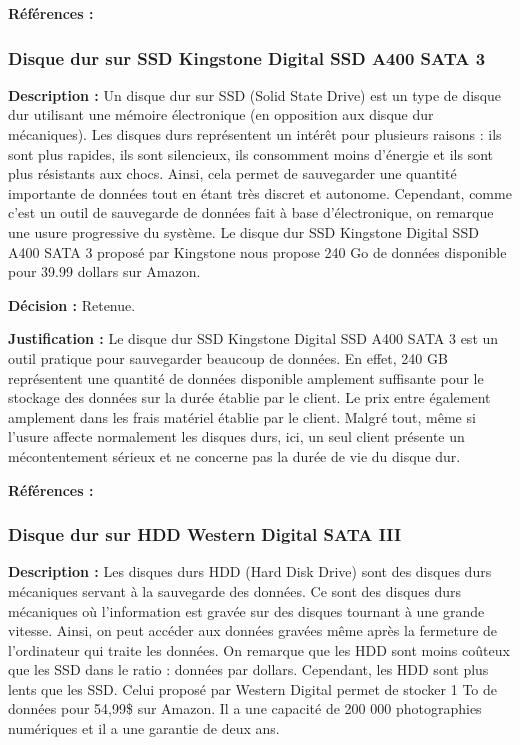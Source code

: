 \textbf{Références :} \cite{hubic} \cite{clgo} \cite{incl}

\subsubsection{Disque dur sur SSD Kingstone Digital SSD A400 SATA 3 }
\textbf{Description :} Un disque dur sur SSD (Solid State Drive) est un type de disque dur utilisant une mémoire électronique (en opposition aux disque dur mécaniques). Les disques durs représentent un intérêt pour plusieurs raisons : ils sont plus rapides, ils sont silencieux, ils consomment moins d’énergie et ils sont plus résistants aux chocs. Ainsi, cela permet de sauvegarder une quantité importante de données tout en étant très discret et autonome. Cependant, comme c’est un outil de sauvegarde de données fait à base d’électronique, on remarque une usure progressive du système. Le disque dur SSD Kingstone Digital SSD A400 SATA 3 proposé par Kingstone nous propose 240 Go de données disponible pour 39.99 dollars sur Amazon. 

\textbf{Décision :} Retenue.

\textbf{Justification :} Le disque dur SSD Kingstone Digital SSD A400 SATA 3 est un outil pratique pour sauvegarder beaucoup de données. En effet, 240 GB représentent une quantité de données disponible amplement suffisante pour le stockage des données sur la durée établie par le client. Le prix entre également amplement dans les frais matériel établie par le client. Malgré tout, même si l’usure affecte normalement les disques durs, ici, un seul client présente un mécontentement sérieux et ne concerne pas la durée de vie du disque dur.

\textbf{Références :} \cite{AMSSD} \cite{DESSD}

\subsubsection{Disque dur sur HDD Western Digital SATA III }

\textbf{Description :} Les disques durs HDD (Hard Disk Drive) sont des disques durs mécaniques servant à la sauvegarde des données. Ce sont des disques durs mécaniques où l’information est gravée sur des disques tournant à une grande vitesse. Ainsi, on peut accéder aux données gravées même après la fermeture de l’ordinateur qui traite les données. On remarque que les HDD sont moins coûteux que les SSD dans le ratio : données par dollars. Cependant, les HDD sont plus lents que les SSD. Celui proposé par Western Digital permet de stocker 1 To de données pour 54,99\$ sur Amazon. Il a une capacité de 200 000 photographies numériques et il a une garantie de deux ans. 


